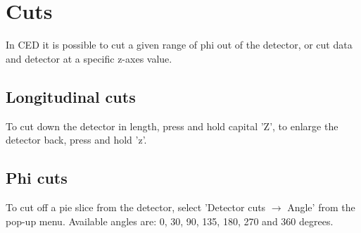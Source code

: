 \documentclass[a4paper,10pt]{article}
\begin{document}
\section{Cuts}
In CED it is possible to cut a given range of phi out of the detector, or cut data and detector at a specific z-axes value.

\subsection{Longitudinal cuts}
To cut down the detector in length, press and hold capital 'Z', to enlarge the detector back, press and hold 'z'.

\subsection{Phi cuts}
To cut off a pie slice from the detector, select 'Detector cuts $\rightarrow$ Angle' from the pop-up menu. Available angles are: 0, 30, 90, 135, 180, 270 and 360 degrees. 
\end{document}
